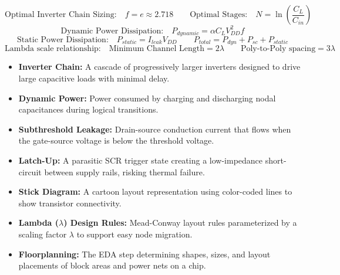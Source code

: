 \documentclass[12pt,a4paper]{article}
\begin{document}
\begin{tcolorbox}[formulabox, title={\textbf{Key Equations}}]
$$\text{Optimal Inverter Chain Sizing:} \quad f = e \approx 2.718 \qquad \text{Optimal Stages:} \quad N = \ln\left(\frac{C_L}{C_{in}}\right)$$
$$\text{Dynamic Power Dissipation:} \quad P_{dynamic} = \alpha C_L V_{DD}^2 f$$
$$\text{Static Power Dissipation:} \quad P_{static} = I_{leak} V_{DD} \qquad P_{total} = P_{dyn} + P_{sc} + P_{static}$$
$$\text{Lambda scale relationship:} \quad \text{Minimum Channel Length} = 2\lambda \qquad \text{Poly-to-Poly spacing} = 3\lambda$$
\end{tcolorbox}

\begin{tcolorbox}[defbox, title={\textbf{One-Line Definitions}}]
\begin{itemize}[leftmargin=*, itemsep=2.5pt, topsep=0pt]
  \item \textbf{Inverter Chain:} A cascade of progressively larger inverters designed to drive large capacitive loads with minimal delay.
  \item \textbf{Dynamic Power:} Power consumed by charging and discharging nodal capacitances during logical transitions.
  \item \textbf{Subthreshold Leakage:} Drain-source conduction current that flows when the gate-source voltage is below the threshold voltage.
  \item \textbf{Latch-Up:} A parasitic SCR trigger state creating a low-impedance short-circuit between supply rails, risking thermal failure.
  \item \textbf{Stick Diagram:} A cartoon layout representation using color-coded lines to show transistor connectivity.
  \item \textbf{Lambda ($\lambda$) Design Rules:} Mead-Conway layout rules parameterized by a scaling factor $\lambda$ to support easy node migration.
  \item \textbf{Floorplanning:} The EDA step determining shapes, sizes, and layout placements of block areas and power nets on a chip.
\end{itemize}
\end{tcolorbox}
\end{document}
